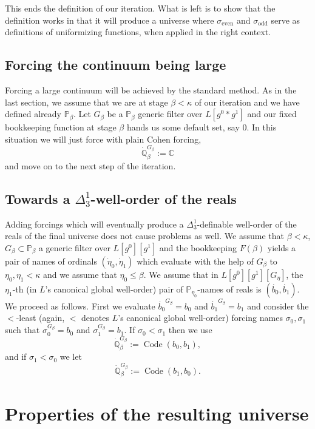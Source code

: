\documentclass[a4paper,11pt]{article}
\newcommand{\forceP}{\mathbb{P}}
\newcommand{\forceQ}{\mathbb{Q}}
\begin{document}
This ends the definition of our iteration. What is left is to show that the definition works in that it will produce a universe where $\sigma_{\text{even}}$ and $\sigma_{\text{odd}}$ serve as definitions of uniformizing functions, when applied in the right context.
\subsection{Forcing the continuum being large}
Forcing a large continuum will be achieved by the standard method. 
As in the last section, we assume that we are at stage $\beta < \kappa$ of our iteration and we have defined already $\forceP_{\beta}$. Let $G_{\beta}$ be a $\forceP_{\beta}$ generic filter over $L[g^0 \ast g^1]$ and our fixed bookkeeping function at stage $\beta$ hands us some default set, say $0$. In this situation we will just force with plain Cohen forcing, 
\[ \dot{\forceQ}_{\beta}^{G_{\beta}} := \mathbb{C} \]
and move on to the next step of the iteration.

\subsection{Towards a $\Delta^1_3$-well-order of the reals}
Adding forcings which will eventually produce a $\Delta^1_3$-definable well-order of the reals of the final universe does not cause problems as well. We assume that $\beta< \kappa$, $G_{\beta} \subset \forceP_{\beta}$ a generic filter over $L[g^0][g^1]$ and the bookkeeping $F(\beta)$ yields a pair of names of ordinals $(\dot{\eta}_0,\dot{\eta}_1)$ which evaluate with the help of $G_{\beta}$ to $\eta_0,\eta_1<\kappa$ and we assume that $\eta_0 \le \beta$. We assume that in $L[g^0][g^1][G_{\eta}]$, the $\eta_1$-th (in $L$'s canonical global well-order) pair of $\forceP_{\eta_0}$-names of reals is  $(\dot{b_0},\dot{b_1})$. We proceed as follows. First we evaluate $\dot{b_0}^{G_{\beta}} =b_0$ and $\dot{b_1}^{G_{\beta}}=b_1$ and consider the $<$-least (again, $<$ denotes $L$'s canonical global well-order) forcing names $\sigma_0,\sigma_1$ such that $\sigma_0^{G_{\beta}}=b_0$ and $\sigma_1^{G_{\beta}}=b_1$.
If $\sigma_0 < \sigma_1$ then we use
\[\dot{\forceQ}_{\beta}^{G_{\beta}} := \operatorname{Code} ({b}_0 ,{b_1}), \]
and if $\sigma_1 < \sigma_0$ we let
\[ \dot{\forceQ}_{\beta}^{G_{\beta}} := \operatorname{Code} (b_1,b_0). \]




\section{Properties of the resulting universe}
\end{document}
